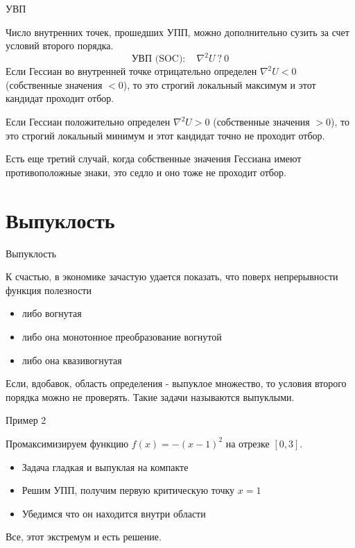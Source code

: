 \documentclass{beamer}
\begin{document}
\begin{frame}{УВП}

Число внутренних точек, прошедших УПП, можно дополнительно сузить за счет условий второго порядка.
$$\text{УВП (SOC)}: \quad  \nabla^2 U \ ? \ 0$$
Если Гессиан во внутренней точке отрицательно определен $\nabla^2 U < 0$ (собственные значения $< 0$), то это \alert{строгий локальный максимум} и этот кандидат проходит отбор.

Если Гессиан положительно определен $\nabla^2 U > 0$ (собственные значения $>0$), то это строгий \alert{локальный минимум} и этот кандидат точно не проходит отбор.

Есть еще третий случай, когда собственные значения Гессиана имеют противоположные знаки, это \alert{седло} и оно тоже не проходит отбор.

\end{frame}

\section{Выпуклость}

\begin{frame}{Выпуклость}

К счастью, в экономике зачастую удается показать, что поверх непрерывности функция полезности

\begin{itemize}
\item либо вогнутая
\item либо она монотонное преобразование вогнутой
\item либо она квазивогнутая
\end{itemize}

Если, вдобавок, область определения - выпуклое множество, то условия второго порядка можно не проверять. Такие задачи называются \alert{выпуклыми}.

\end{frame}

\begin{frame}{Пример 2}

Промаксимизируем функцию $f(x) = -(x-1)^2$ на отрезке $[0,3]$.

\begin{itemize}
  \item Задача гладкая и выпуклая на компакте
  \item Решим УПП, получим первую критическую точку $x = 1$
  \item Убедимся что он находится внутри области
\end{itemize}

Все, этот экстремум и есть решение.

\end{frame}
\end{document}
